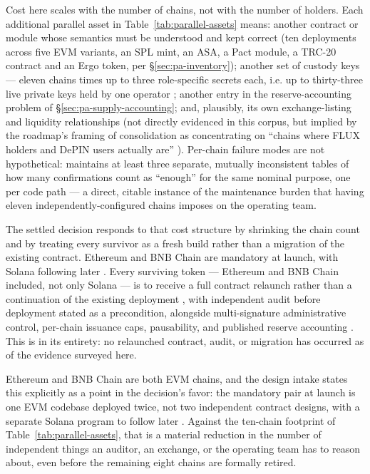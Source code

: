 Cost here scales with the number of chains, not with the number of holders. Each additional parallel
asset in Table~\ref{tab:parallel-assets} means: another contract or module whose semantics must be
understood and kept correct (ten deployments across five EVM variants, an SPL mint, an
ASA, a Pact module, a TRC-20 contract and an Ergo token, per \S\ref{sec:pa-inventory}); another set
of custody keys — eleven chains times up to three role-specific secrets each, i.e. up to
thirty-three live private keys held by one operator
\shipped {}; another entry in the reserve-accounting
problem of \S\ref{sec:pa-supply-accounting}; and, plausibly, its own exchange-listing and liquidity
relationships \srcinferred (not directly evidenced in this corpus, but implied by the roadmap's
framing of consolidation as concentrating on ``chains where FLUX holders and DePIN users actually
are'' ). Per-chain failure modes are not hypothetical:
\Fusion maintains at least three separate, mutually inconsistent tables of how many confirmations
count as ``enough'' for the same nominal purpose, one per code path
\shipped {} —
a direct, citable instance of the maintenance burden that having eleven independently-configured
chains imposes on the operating team.

The settled decision responds to that cost structure by shrinking the chain count and by treating
every survivor as a fresh build rather than a migration of the existing contract. Ethereum and BNB
Chain are mandatory at launch, with Solana following later
. Every surviving token — Ethereum and BNB Chain included, not only
Solana — is to receive a full contract relaunch rather than a continuation of the existing deployment
, with independent audit before deployment stated as a precondition,
alongside multi-signature administrative control, per-chain issuance caps, pausability, and published
reserve accounting . This is \planned in its entirety: no
relaunched contract, audit, or migration has occurred as of the evidence surveyed here.

Ethereum and BNB Chain are both EVM chains, and the design intake states this explicitly as a point
in the decision's favor: the mandatory pair at launch is one EVM codebase deployed twice, not two
independent contract designs, with a separate Solana program to follow later
. Against the ten-chain footprint of
Table~\ref{tab:parallel-assets}, that is a material reduction in the number of independent things an
auditor, an exchange, or the operating team has to reason about, even before the remaining eight
chains are formally retired.


